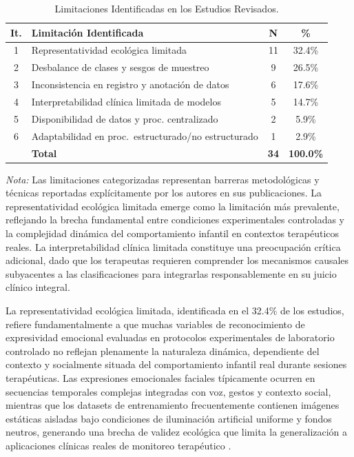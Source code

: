 \documentclass[ASNA,twocolumn]{USG}
\begin{document}
	\begin{table}[!ht]
		\centering
		\caption{Limitaciones Identificadas en los Estudios Revisados.\label{tab13}}
		{\setlength{\tabcolsep}{3pt}
			\begin{tabular*}{\columnwidth}{@{\extracolsep\fill}clcc@{\extracolsep\fill}}
				\toprule
				\textbf{It.} & \textbf{Limitación Identificada} & \textbf{N} & \textbf{\%} \\
				\midrule
				1 & Representatividad ecológica limitada                  & 11 & 32.4\% \\
				2 & Desbalance de clases y sesgos de muestreo             & 9  & 26.5\% \\
				3 & Inconsistencia en registro y anotación de datos       & 6  & 17.6\% \\
				4 & Interpretabilidad clínica limitada de modelos         & 5  & 14.7\% \\
				5 & Disponibilidad de datos y proc. centralizado          & 2  & 5.9\%  \\
				6 & Adaptabilidad en proc.\ estructurado/no estructurado & 1 & 2.9\% \\[12pt]
				& \textbf{Total}                                        & \textbf{34} & \textbf{100.0\%} \\
				\bottomrule
		\end{tabular*}}
		\begin{tablenotes}
			\item {\it Nota:} Las limitaciones categorizadas representan barreras metodológicas
			y técnicas reportadas explícitamente por los autores en sus publicaciones. La
			representatividad ecológica limitada emerge como la limitación más prevalente,
			reflejando la brecha fundamental entre condiciones experimentales controladas y la
			complejidad dinámica del comportamiento infantil en contextos terapéuticos reales.
			La interpretabilidad clínica limitada constituye una preocupación crítica adicional,
			dado que los terapeutas requieren comprender los mecanismos causales subyacentes a
			las clasificaciones para integrarlas responsablemente en su juicio clínico integral.
		\end{tablenotes}
	\end{table}
	
	La representatividad ecológica limitada, identificada en el 32.4\% de los estudios,
	refiere fundamentalmente a que muchas variables de reconocimiento de expresividad
	emocional evaluadas en protocolos experimentales de laboratorio controlado no
	reflejan plenamente la naturaleza dinámica, dependiente del contexto y socialmente
	situada del comportamiento infantil real durante sesiones terapéuticas. Las
	expresiones emocionales faciales típicamente ocurren en secuencias temporales
	complejas integradas con voz, gestos y contexto social, mientras que los datasets
	de entrenamiento frecuentemente contienen imágenes estáticas aisladas bajo
	condiciones de iluminación artificial uniforme y fondos neutros, generando una
	brecha de validez ecológica que limita la generalización a aplicaciones clínicas
	reales de monitoreo terapéutico \cite{Johnson2025,Radocaj2025}.
	
\end{document}
